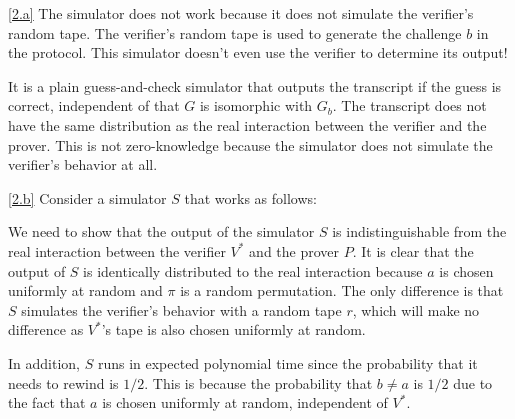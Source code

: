 \documentclass{homework}
\begin{document}
\begin{solution}

  \ref{2.a}
  The simulator does not work because it does not simulate the verifier's
  random tape. The verifier's random tape is used to generate the challenge
  $b$ in the protocol. This simulator doesn't even use the verifier to
  determine its output!   

  It is a plain guess-and-check simulator that
  outputs the transcript if the guess is correct, independent of
  that $G$ is isomorphic with $G_b$.
  The transcript does not have the same distribution as the real
  interaction between the verifier and the prover.
  This is not zero-knowledge because the simulator
  does not simulate the verifier's behavior at all.

  \ref{2.b}
  Consider a simulator $S$ that works as follows:
  \begin{algorithmic}[1]
  \end{algorithmic}

  We need to show that the output of the simulator $S$ is indistinguishable from
  the real interaction between the verifier $V^*$ and the prover $P$.
  It is clear that the output of $S$ is identically distributed to the real
  interaction because $a$ is chosen uniformly at random and $\pi$ is a random
  permutation. The only difference is that $S$ simulates the verifier's behavior
  with a random tape $r$, which will make no difference as $V^*$'s tape is
  also chosen uniformly at random.

  In addition, $S$ runs in expected polynomial time since the probability that it
  needs to rewind is $1/2$. This is because the probability that $b \neq a$
  is $1/2$ due to the fact that $a$ is chosen uniformly at random,
  independent of $V^*$.

\end{solution}
\end{document}
